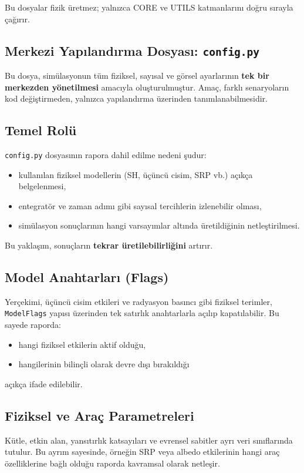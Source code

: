 Bu dosyalar fizik üretmez; yalnızca CORE ve UTILS katmanlarını doğru sırayla çağırır.


\subsection{Merkezi Yapılandırma Dosyası: \texttt{config.py}}
\label{subsec:config}

Bu dosya, simülasyonun tüm fiziksel, sayısal ve görsel ayarlarının
\textbf{tek bir merkezden yönetilmesi} amacıyla oluşturulmuştur.
Amaç, farklı senaryoların kod değiştirmeden, yalnızca yapılandırma üzerinden tanımlanabilmesidir.

\subsection*{Temel Rolü}
\texttt{config.py} dosyasının rapora dahil edilme nedeni şudur:
\begin{itemize}
  \item kullanılan fiziksel modellerin (SH, üçüncü cisim, SRP vb.) açıkça belgelenmesi,
  \item entegratör ve zaman adımı gibi sayısal tercihlerin izlenebilir olması,
  \item simülasyon sonuçlarının hangi varsayımlar altında üretildiğinin netleştirilmesi.
\end{itemize}

Bu yaklaşım, sonuçların \textbf{tekrar üretilebilirliğini} artırır.

\subsection*{Model Anahtarları (Flags)}
Yerçekimi, üçüncü cisim etkileri ve radyasyon basıncı gibi
fiziksel terimler,
\texttt{ModelFlags} yapısı üzerinden
tek satırlık anahtarlarla açılıp kapatılabilir.
Bu sayede raporda:
\begin{itemize}
  \item hangi fiziksel etkilerin aktif olduğu,
  \item hangilerinin bilinçli olarak devre dışı bırakıldığı
\end{itemize}
açıkça ifade edilebilir.

\subsection*{Fiziksel ve Araç Parametreleri}
Kütle, etkin alan, yansıtırlık katsayıları ve evrensel sabitler
ayrı veri sınıflarında tutulur.
Bu ayrım sayesinde,
örneğin SRP veya albedo etkilerinin
hangi araç özelliklerine bağlı olduğu
raporda kavramsal olarak netleşir.

